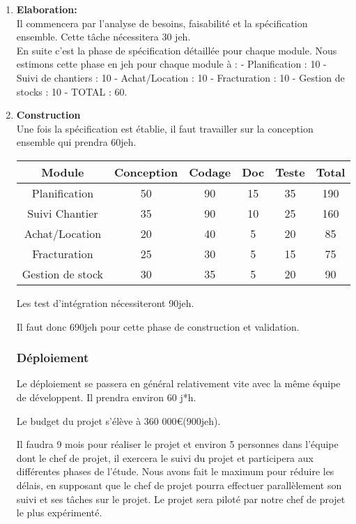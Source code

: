     \begin{enumerate}
    \item \textbf{Elaboration:}\\ Il commencera par l'analyse de besoins, faisabilité et la spécification ensemble. Cette tâche nécessitera  30 jeh. \\

    En suite c'est la phase de spécification détaillée pour chaque module. Nous estimons cette phase en jeh pour chaque module à :
         - Planification : 10
         - Suivi de chantiers : 10 
         - Achat/Location : 10 
         - Fracturation : 10
         - Gestion de stocks : 10 
         - TOTAL : 60.

    \item \textbf{Construction}\\
    Une fois la spécification est établie, il faut travailler sur la conception ensemble qui prendra 60jeh. 

    \begin{center} 
        \begin{tabular}{ |c| c| c | c | c |c |}
        \hline
	    Module&Conception&Codage&Doc&Teste&Total\\ \hline
        Planification & 50 & 90 & 15 &35&190\\ \hline
        Suivi Chantier &35&90&10&25&160 \\ \hline
        Achat/Location &20&40&5&20&85  \\ \hline
        Fracturation &25&30&5&15&75\\ \hline
        Gestion de stock &30&35&5&20&90 \\
        \hline
        \end{tabular}
    \end{center}

    Les test d'intégration nécessiteront 90jeh.

    Il faut donc 690jeh pour cette phase de construction et validation.

    \subsubsection{Déploiement}

    Le déploiement se passera en général relativement vite avec la même équipe de développent. Il prendra environ 60 j*h.

    Le budget du projet s'élève à 360 000€(900jeh).

    Il faudra 9 mois pour réaliser le projet et environ 5 personnes dans l'équipe dont le chef de projet, il exercera le suivi du projet et participera aux différentes phases de l'étude. Nous avons fait le maximum pour réduire les délais, en supposant que le chef de projet pourra effectuer parallèlement son suivi et ses tâches sur le projet. Le projet sera piloté par notre chef de projet le plus expérimenté.


\end{enumerate}
